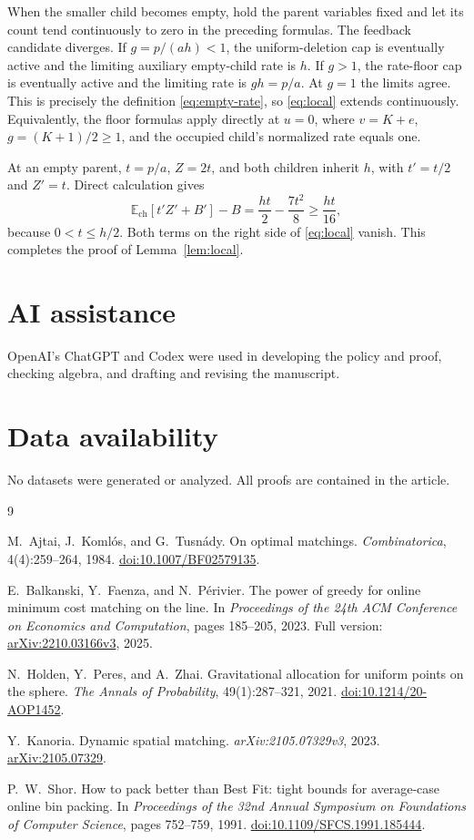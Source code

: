 \documentclass[11pt]{article}
\numberwithin{equation}{section}
\theoremstyle{remark}
\newcommand{\E}{\mathbb E}
\begin{document}
When the smaller child becomes empty, hold the parent variables fixed and
let its count tend continuously to zero in the preceding formulas. The
feedback candidate diverges. If \(g=p/(ah)<1\), the uniform-deletion cap
is eventually active and the limiting auxiliary empty-child rate is
\(h\). If \(g>1\), the rate-floor cap is eventually active and the limiting
rate is \(gh=p/a\). At \(g=1\) the limits agree. This is precisely the
definition \eqref{eq:empty-rate}, so \eqref{eq:local} extends continuously.
Equivalently, the floor formulas apply directly at \(u=0\), where
\(v=K+e\), \(g=(K+1)/2\ge1\), and the occupied child's normalized rate
equals one.

At an empty parent, \(t=p/a\), \(Z=2t\), and both children inherit \(h\),
with \(t'=t/2\) and \(Z'=t\). Direct calculation gives
\[
\E_{\mathrm{ch}}[t'Z'+B']-B
=\frac{ht}{2}-\frac{7t^2}{8}
\ge\frac{ht}{16},
\]
because \(0<t\le h/2\). Both terms on the right side of
\eqref{eq:local} vanish. This completes the proof of
Lemma~\ref{lem:local}.


\section*{AI assistance}
OpenAI's ChatGPT and Codex were used in developing the policy and proof,
checking algebra, and drafting and revising the manuscript.

\section*{Data availability}
No datasets were generated or analyzed. All proofs are contained in the
article.

\begin{thebibliography}{9}

M.~Ajtai, J.~Koml\'os, and G.~Tusn\'ady.
On optimal matchings.
\emph{Combinatorica}, 4(4):259--264, 1984.
\href{https://doi.org/10.1007/BF02579135}{doi:10.1007/BF02579135}.

E.~Balkanski, Y.~Faenza, and N.~P\'erivier.
The power of greedy for online minimum cost matching on the line.
In \emph{Proceedings of the 24th ACM Conference on Economics and
Computation}, pages 185--205, 2023.
Full version: \href{https://arxiv.org/abs/2210.03166v3}{arXiv:2210.03166v3},
2025.

N.~Holden, Y.~Peres, and A.~Zhai.
Gravitational allocation for uniform points on the sphere.
\emph{The Annals of Probability}, 49(1):287--321, 2021.
\href{https://doi.org/10.1214/20-AOP1452}{doi:10.1214/20-AOP1452}.

Y.~Kanoria.
Dynamic spatial matching.
\emph{arXiv:2105.07329v3}, 2023.
\href{https://arxiv.org/abs/2105.07329v3}{arXiv:2105.07329}.

P.~W.~Shor.
How to pack better than Best Fit: tight bounds for average-case online
bin packing.
In \emph{Proceedings of the 32nd Annual Symposium on Foundations of
Computer Science}, pages 752--759, 1991.
\href{https://doi.org/10.1109/SFCS.1991.185444}{doi:10.1109/SFCS.1991.185444}.

\end{thebibliography}
\end{document}
